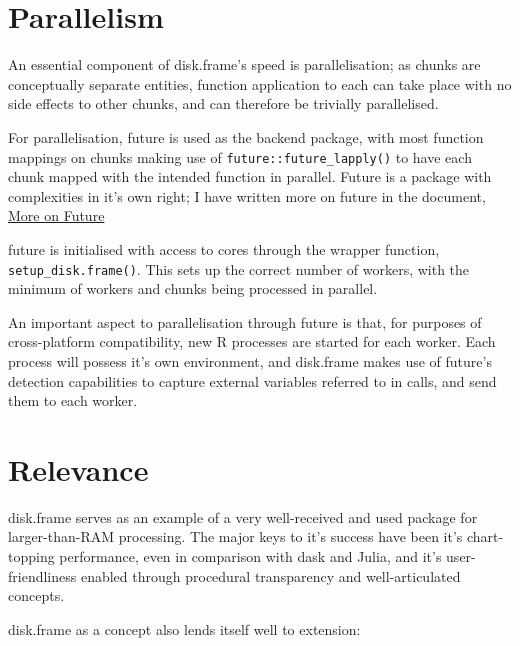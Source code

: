 \documentclass[10pt,a4paper]{article}
\begin{document}
\section{Parallelism}
\label{sec:parallelisation}

An essential component of disk.frame's speed is parallelisation; as
chunks are conceptually separate entities, function application to
each can take place with no side effects to other chunks, and can
therefore be trivially parallelised.

For parallelisation, future is used as the backend package, with most
function mappings on chunks making use of
\texttt{future::future\_lapply()} to have each chunk mapped with the
intended function in parallel. Future is a package with complexities
in it's own right; I have written more on future in the document,
\href{more-on-future.pdf}{More on Future}

future is initialised with access to cores through the wrapper
function, \texttt{setup\_disk.frame()}\cite{zj19:_key}. This sets up
the correct number of workers, with the minimum of workers and chunks
being processed in parallel.

An important aspect to parallelisation through future is that, for
purposes of cross-platform compatibility, new R processes are started
for each worker\cite{zj19:_using}. Each process will possess it's own
environment, and disk.frame makes use of future's detection
capabilities to capture external variables referred to in calls, and
send them to each worker.

\section{Relevance}
\label{sec:relevance}

disk.frame serves as an example of a very well-received and used
package for larger-than-RAM processing. The major keys to it's success
have been it's chart-topping performance, even in comparison with dask
and Julia, and it's user-friendliness enabled through procedural
transparency and well-articulated concepts.

disk.frame as a concept also lends itself well to extension:
\end{document}
